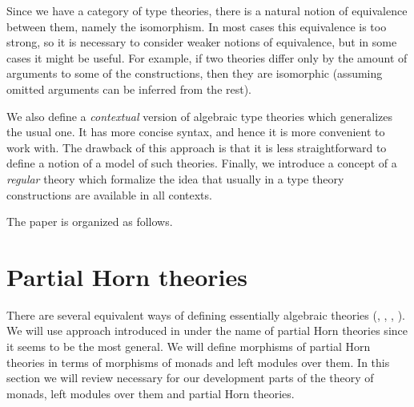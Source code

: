 \documentclass[reqno]{amsart}
\theoremstyle{definition}
\theoremstyle{remark}
\numberwithin{figure}{section}
\begin{document}
Since we have a category of type theories, there is a natural notion of equivalence between them, namely the isomorphism.
In most cases this equivalence is too strong, so it is necessary to consider weaker notions of equivalence, but in some cases it might be useful.
For example, if two theories differ only by the amount of arguments to some of the constructions,
then they are isomorphic (assuming omitted arguments can be inferred from the rest).

We also define a \emph{contextual} version of algebraic type theories which generalizes the usual one.
It has more concise syntax, and hence it is more convenient to work with.
The drawback of this approach is that it is less straightforward to define a notion of a model of such theories.
Finally, we introduce a concept of a \emph{regular} theory which formalize the idea that usually in a type theory constructions are available in all contexts.

The paper is organized as follows.

\begin{comment}
\section{Contextual categories}

Contextual categories were defined by Cartmell \cite{GAT}.
An equivalent definition was given by Voevodsky in \cite{c-systems}.
In this section we will give another equivalent definition which is just a description of models of the initial algebraic type theory as we will see later.
\end{comment}

\section{Partial Horn theories}

There are several equivalent ways of defining essentially algebraic theories (\cite{LPC}, \cite{GAT}, \cite{PHL}, \cite[D 1.3.4]{elephant}).
We will use approach introduced in \cite{PHL} under the name of partial Horn theories since it seems to be the most general.
We will define morphisms of partial Horn theories in terms of morphisms of monads and left modules over them.
In this section we will review necessary for our development parts of the theory of monads, left modules over them and partial Horn theories.
\end{document}
